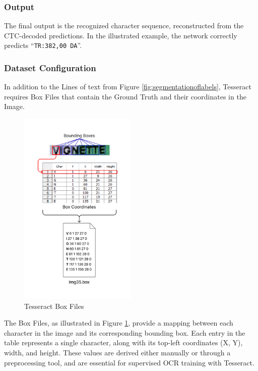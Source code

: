 \subsubsection*{Output}
The final output is the recognized character sequence, reconstructed from the CTC-decoded predictions. In the illustrated example, the network correctly predicts “\texttt{TR:382,00 DA}”.

\subsubsection{Dataset Configuration}

In addition to the Lines of text from Figure \ref{fig:segmentationoflabels}, Tesseract requires Box Files that contain the Ground Truth and their coordinates in the Image.

\begin{figure}[H]
\centering
\includegraphics[width=0.50\textwidth]{Figures/Chapter 3/tesseract_Box_Files.png}
\caption{Tesseract Box Files}
\label{fig:tesseractboxfiles}
\end{figure}

The Box Files, as illustrated in Figure \ref{fig:tesseractboxfiles}, provide a mapping between each character in the image and its corresponding bounding box. Each entry in the table represents a single character, along with its top-left coordinates (X, Y), width, and height. These values are derived either manually or through a preprocessing tool, and are essential for supervised OCR training with Tesseract.

